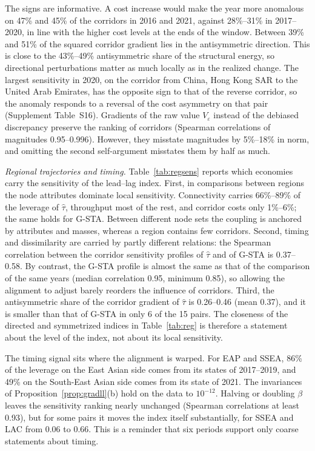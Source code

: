 \documentclass[12pt]{article}
\theoremstyle{definition}
\begin{document}
The signs are informative. A cost increase would make the year more anomalous on 47\% and 45\% of the corridors in 2016 and 2021, against 28\%--31\% in 2017--2020, in line with the higher cost levels at the ends of the window. Between 39\% and 51\% of the squared corridor gradient lies in the antisymmetric direction. This is close to the 43\%--49\% antisymmetric share of the structural energy, so directional perturbations matter as much locally as in the realized change. The largest sensitivity in 2020, on the corridor from China, Hong Kong SAR to the United Arab Emirates, has the opposite sign to that of the reverse corridor, so the anomaly responds to a reversal of the cost asymmetry on that pair (Supplement Table~S16). Gradients of the raw value $V_\varepsilon$ instead of the debiased discrepancy preserve the ranking of corridors (Spearman correlations of magnitudes 0.95--0.996). However, they misstate magnitudes by 5\%--18\% in norm, and omitting the second self-argument misstates them by half as much.

\emph{Regional trajectories and timing.} Table~\ref{tab:regsens} reports which economies carry the sensitivity of the lead--lag index. First, in comparisons between regions the node attributes dominate local sensitivity. Connectivity carries 66\%--89\% of the leverage of $\hat\tau$, throughput most of the rest, and corridor costs only 1\%--6\%; the same holds for G-STA. Between different node sets the coupling is anchored by attributes and masses, whereas a region contains few corridors. Second, timing and dissimilarity are carried by partly different relations: the Spearman correlation between the corridor sensitivity profiles of $\hat\tau$ and of G-STA is 0.37--0.58. By contrast, the G-STA profile is almost the same as that of the comparison of the same years (median correlation 0.95, minimum 0.85), so allowing the alignment to adjust barely reorders the influence of corridors. Third, the antisymmetric share of the corridor gradient of $\hat\tau$ is 0.26--0.46 (mean 0.37), and it is smaller than that of G-STA in only 6 of the 15 pairs. The closeness of the directed and symmetrized indices in Table~\ref{tab:reg} is therefore a statement about the level of the index, not about its local sensitivity.

The timing signal sits where the alignment is warped. For EAP and SSEA, 86\% of the leverage on the East Asian side comes from its states of 2017--2019, and 49\% on the South-East Asian side comes from its state of 2021. The invariances of Proposition~\ref{prop:gradll}(b) hold on the data to $10^{-12}$. Halving or doubling $\beta$ leaves the sensitivity ranking nearly unchanged (Spearman correlations at least 0.93), but for some pairs it moves the index itself substantially, for SSEA and LAC from 0.06 to 0.66. This is a reminder that six periods support only coarse statements about timing.
\end{document}
